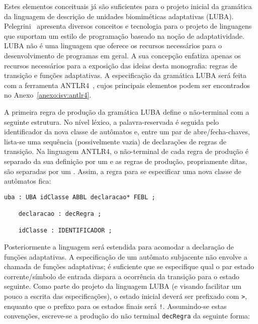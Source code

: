 
Estes elementos conceituais já são suficientes para o projeto inicial da gramática da linguagem de descrição de unidades biomiméticas adaptativas (LUBA). Pelegrini~\cite{pelegrini:2009} apresenta diversos conceitos e tecnologia para o projeto de linguagens que suportam um estilo de programação baseado na noção de adaptatividade. LUBA não é uma linguagem que oferece os recursos necessários para o desenvolvimento de programas em geral. A sua concepção enfatiza apenas os recursos necessários para a exposição das ideias desta monografia: regras de transição e funções adaptativas. A especificação da gramática LUBA será feita com a ferramenta ANTLR4~\cite{parr:2013}, cujos principais elementos podem ser encontrados no Anexo~\ref{anexo:isv:antlr4}.

A primeira regra de produção da gramática LUBA define o não-terminal  com a seguinte estrutura. No nível léxico, a palavra-reservada  é seguida pelo identificador da nova classe de autômatos e, entre um par de abre/fecha-chaves, lista-se uma sequência (possivelmente vazia) de declarações de regras de transição. Na linguagem ANTLR4, o não-terminal de cada regra de produção é separado da sua definição por um \terminal{:} e as regras de produção, propriamente ditas, são separadas por um \terminal{;}. Assim, a regra para se especificar uma nova classe de autômatos  fica:

\begin{lstlisting}[style=antlr]
uba : UBA idClasse ABBL declaracao* FEBL ;

	declaracao : decRegra ;

	idClasse : IDENTIFICADOR ;
\end{lstlisting}

Posteriormente a linguagem será estendida para acomodar a declaração de funções adaptativas. A especificação de um autômato subjacente não envolve a chamada de funções adaptativas; é suficiente que se especifique qual o par estado corrente/símbolo de entrada dispara a ocorrência da transição para o estado seguinte. Como parte do projeto da linguagem LUBA (e visando facilitar um pouco a escrita das especificações), o estado inicial deverá ser prefixado com \lstinline[style=antlr]'>', enquanto que o prefixo para os estados finais será \lstinline[style=antlr]'!'. Assumindo-se estas convenções, escreve-se a produção do não terminal \lstinline[style=antlr]!decRegra! da seguinte forma:

